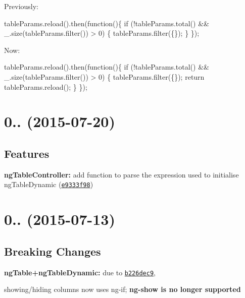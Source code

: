 Previously\+:


\begin{DoxyCode}
tableParams.reload().then(function()\{
  if (!tableParams.total() && \_.size(tableParams.filter()) > 0) \{
        tableParams.filter(\{\});
  \}
\});
\end{DoxyCode}


Now\+:


\begin{DoxyCode}
tableParams.reload().then(function()\{
  if (!tableParams.total() && \_.size(tableParams.filter()) > 0) \{
        tableParams.filter(\{\});
        return tableParams.reload();
  \}
\});
\end{DoxyCode}


\label{_0.7.1}%
 \section*{0.. (2015-\/07-\/20)}

\subsection*{Features}


\begin{DoxyItemize}
\item {\bfseries ng\+Table\+Controller\+:} add function to parse the expression used to initialise ng\+Table\+Dynamic (\href{https://github.com/esvit/ng-table/commit/e9333f980764e48685477b93bb5031575b0963cf}{\tt e9333f98})
\end{DoxyItemize}

\label{_0.7.0}%
 \section*{0.. (2015-\/07-\/13)}

\subsection*{Breaking Changes}


\begin{DoxyItemize}
\item {\bfseries ng\+Table+ng\+Table\+Dynamic\+:} due to \href{https://github.com/esvit/ng-table/commit/b226dec9537769aaf355bf5a908f380622feba92}{\tt b226dec9},
\item showing/hiding columns now uses ng-\/if; {\bfseries ng-\/show is no longer supported}
\end{DoxyItemize}

